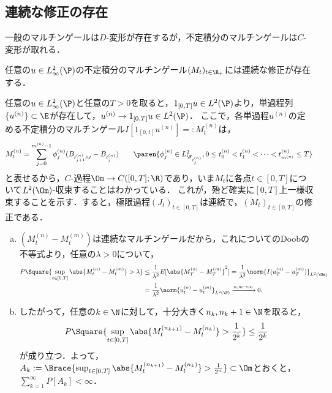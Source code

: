 \documentclass[uplatex,dvipdfmx]{jsreport}
\begin{document}
\subsection{連続な修正の存在}

\begin{tcolorbox}[colframe=ForestGreen, colback=ForestGreen!10!white,breakable,colbacktitle=ForestGreen!40!white,coltitle=black,fonttitle=\bfseries\sffamily,
title=]
    一般のマルチンゲールは$D$-変形が存在するが，不定積分のマルチンゲールは$C$-変形が取れる．
\end{tcolorbox}

\begin{proposition}[$C$-過程と同等]
    任意の$u\in L^2_\infty(\P)$の不定積分のマルチンゲール$(M_t)_{t\in\R_+}$には連続な修正が存在する．
\end{proposition}
\begin{Proof}
    任意の$u\in L^2_\infty(\P)$と任意の$T>0$を取ると，$1_{[0,T]}u\in L^2(\P)$より，単過程列$\{u^{(n)}\}\subset\E$が存在して，$u^{(n)}\to 1_{[0,T]}u\in L^2(\P)$．
    ここで，各単過程$u^{(n)}$の定める不定積分のマルチンゲール$I[1_{[0,t]}u^{(n)}]=:M_t^{(n)}$は，
    \[M^{(n)}_t=\sum_{j=0}^{m^{(n)}-1}\phi_j^{(n)}(B_{t_{j+1}^{(n)}\land t}-B_{t_j^{(n)}})\qquad\paren{\phi_j^{(n)}\in L^2_{\F_{t_j^{(n)}}},0\le t_0^{(n)}<t_1^{(n)}<\cdots<t_{m^{(n)}}^{(n)}\le T}\]
    と表せるから，$C$-過程$\Om\to C([0,T];\R)$であり，いま$M_t$に各点$t\in[0,T]$について$L^2(\Om)$-収束することはわかっている．
    これが，殆ど確実に$[0,T]$上一様収束することを示す．すると，極限過程$(J_t)_{t\in[0,T]}$は連続で，$(M_t)_{t\in[0,T]}$の修正である．
    \begin{enumerate}[(a)]
        \item $(M_t^{(n)}-M_t^{(m)})$は連続なマルチンゲールだから，これについてのDoobの不等式より，任意の$\lambda>0$について，
        \begin{align*}
            P\Square{\sup_{t\in[0,T]}\abs{M_t^{(n)}-M_t^{(m)}}>\lambda}&\le\frac{1}{\lambda^2}E[\abs{M^{(n)}_T-M^{(m)}_T}^2]=\frac{1}{\lambda^2}\norm{I(u^{(n)}_T-u^{(m)}_T)}_{L^2(\Om)}\\
            &=\frac{1}{\lambda^2}\norm{u^{(n)}_t-u^{(m)}_t}_{L^2(\P)}\xrightarrow{n,m\to\infty}0.
        \end{align*}
        \item したがって，任意の$k\in\N$に対して，十分大きく$n_k,n_k+1\in\N$を取ると，
        \[P\Square{\sup_{t\in[0,T]}\abs{M_t^{(n_{k+1})}-M_t^{(n_k)}}>\frac{1}{2^k}}\le\frac{1}{2^k}\]
        が成り立つ．よって，$A_k:=\Brace{\sup_{t\in[0,T]}\abs{M_t^{(n_{k+1})}-M_t^{(n_k)}}>\frac{1}{2^n}}\subset\Om$とおくと，$\sum^\infty_{k=1}P[A_k]<\infty$．

\end{enumerate}
\end{Proof}
\end{document}
